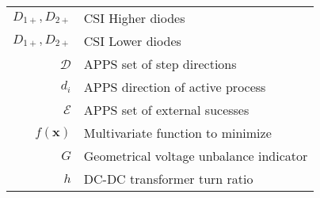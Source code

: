 \begin{scriptsize}
\begin{tabularx}{\textwidth}{r|X}
$D_{1+},D_{2+}$										& CSI Higher diodes\\
$D_{1+},D_{2+}$										& CSI Lower diodes\\
$\mathcal{D}$                                       & APPS set of step directions\\
$d_i$												& APPS direction of active process\\
$\mathcal{E}$               & APPS set of external sucesses\\
  $f(\textbf{x})$										& Multivariate function to minimize\\
$G$                               & Geometrical voltage unbalance indicator \\
$h$                                                             & DC-DC transformer turn ratio\\


\end{tabularx}
\end{scriptsize}
